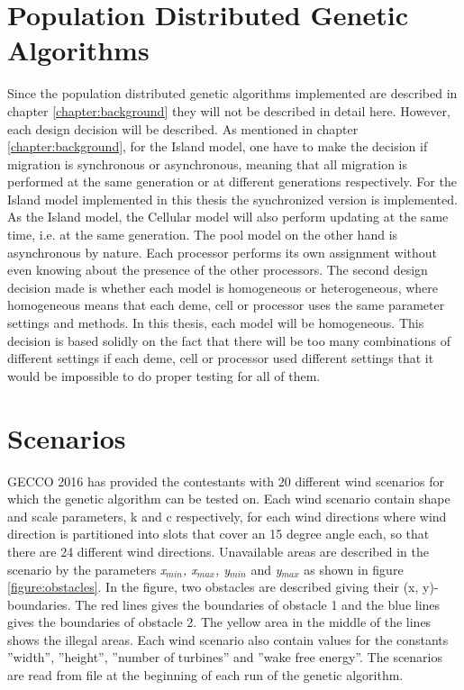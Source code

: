 \section{Population Distributed Genetic Algorithms}\label{section:population distributed gas}
Since the population distributed genetic algorithms implemented are described in chapter \ref{chapter:background} they will not be described in detail here. However, each design decision will be described. As mentioned in chapter \ref{chapter:background}, for the Island model, one have to make the decision if migration is synchronous or asynchronous, meaning that all migration is performed at the same generation or at different generations respectively. For the Island model implemented in this thesis the synchronized version is implemented. As the Island model, the Cellular model will also perform updating at the same time, i.e. at the same generation. The pool model on the other hand is asynchronous by nature. Each processor performs its own assignment without even knowing about the presence of the other processors. The second design decision made is whether each model is homogeneous or heterogeneous, where homogeneous means that each deme, cell or processor uses the same parameter settings and methods. In this thesis, each model will be homogeneous. This decision is based solidly on the fact that there will be too many combinations of different settings if each deme, cell or processor used different settings that it would be impossible to do proper testing for all of them. 


\section{Scenarios}\label{section:scenarios}
GECCO 2016 has provided the contestants with 20 different wind scenarios for which the genetic algorithm can be tested on. Each wind scenario contain shape and scale parameters, k and c respectively, for each wind directions where wind direction is partitioned into slots that cover an 15 degree angle each, so that there are 24 different wind directions. Unavailable areas are described in the scenario by the parameters \textit{x$_{min}$, x$_{max}$, y$_{min}$} and \textit{y$_{max}$} as shown in figure \ref{figure:obstacles}. In the figure, two obstacles are described giving their (x, y)-boundaries. The red lines gives the boundaries of obstacle 1 and the blue lines gives the boundaries of obstacle 2. The yellow area in the middle of the lines shows the illegal areas. Each wind scenario also contain values for the constants ''width'', ''height'', ''number of turbines'' and ''wake free energy''. The scenarios are read from file at the beginning of each run of the genetic algorithm. 


